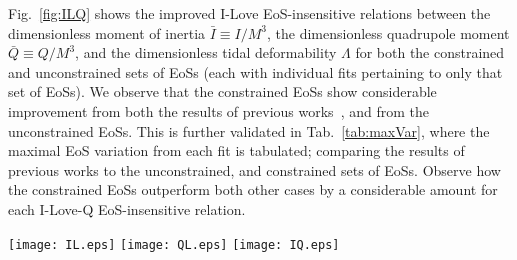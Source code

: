 \documentclass[prd,twocolumn,nofootinbib,superscriptaddress,amsmath,amssymb]{revtex4-1}
\begin{document}
Fig.~\ref{fig:ILQ} shows the improved I-Love EoS-insensitive relations between the dimensionless moment of inertia $\bar{I} \equiv I/M^3$, the dimensionless quadrupole moment $\bar{Q} \equiv Q/M^3$, and the dimensionless tidal deformability $\Lambda$ for both the constrained and unconstrained sets of EoSs (each with individual fits pertaining to only that set of EoSs).
We observe that the constrained EoSs show considerable improvement from both the results of previous works~\cite{Yagi:ILQ}, and from the unconstrained EoSs.
This is further validated in Tab.~\ref{tab:maxVar}, where the maximal EoS variation from each fit is tabulated; comparing the results of previous works to the unconstrained, and constrained sets of EoSs.
Observe how the constrained EoSs outperform both other cases by a considerable amount for each I-Love-Q EoS-insensitive relation.

\begin{figure*}
\begin{center} 
\texttt{[image: IL.eps]}
\texttt{[image: QL.eps]}
\texttt{[image: IQ.eps]}
\end{center}
\caption{
Individual I-Love EoS-insensitive relations $\bar{I}-\Lambda$ (left), $\bar{Q}-\Lambda$ (center), and $\bar{I}-\bar{Q}$ (right), shown for both the constrained EoSs (solid green) and unconstrained EoSs (dotted maroon).
In these figures, the black dashed lines corresponds to the fits given by Eq.~\ref{eq:ILQfitNew} (note: each panel contains individual fits for the constrained and unconstrained EoSs, indistinguishable on such a large scale).
Observe how the fractional difference from the fits, shown in the bottom panels, is greatly suppressed for the constrained case, compared to both the unconstrained case, and results from previous works~\cite{Yagi:ILQ}.
The maximal EoS variation from the fits for the unconstrained and constrained sets of EoSs are compared in Tab.~\ref{tab:maxVar}.
Additionally shown in this figure is the fractional difference from the nuclear matter fits for the 10 hybrid star EoSs (dashed green).
}
\label{fig:ILQ}
\end{figure*} 
\end{document}
